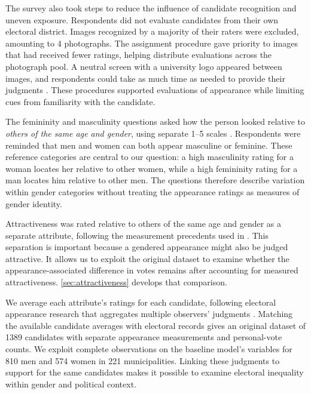 \documentclass[11pt,a4paper]{article}\usepackage[]{graphicx}\usepackage[]{xcolor}
\begin{document}
The survey also took steps to reduce the influence of candidate recognition and uneven exposure. Respondents did not evaluate candidates from their own electoral district. Images recognized by a majority of their raters were excluded, amounting to 4 photographs. The assignment procedure gave priority to images that had received fewer ratings, helping distribute evaluations across the photograph pool. A neutral screen with a university logo appeared between images, and respondents could take as much time as needed to provide their judgments \parencite{Bahamonde2024}. These procedures supported evaluations of appearance while limiting cues from familiarity with the candidate.

The femininity and masculinity questions asked how the person looked relative to \emph{others of the same age and gender}, using separate 1--5 scales \parencite{Bahamonde2024,HossEtAl2005}. Respondents were reminded that men and women can both appear masculine or feminine. These reference categories are central to our question: a high masculinity rating for a woman locates her relative to other women, while a high femininity rating for a man locates him relative to other men. The questions therefore describe variation within gender categories without treating the appearance ratings as measures of gender identity.

Attractiveness was rated relative to others of the same age and gender as a separate attribute, following the measurement precedents used in \textcite{Bono2017,GriffinLanglois2006,Tu2022}. This separation is important because a gendered appearance might also be judged attractive. It allows us to exploit the original dataset to examine whether the appearance-associated difference in votes remains after accounting for measured attractiveness. \autoref{sec:attractiveness} develops that comparison.

We average each attribute's ratings for each candidate, following electoral appearance research that aggregates multiple observers' judgments \parencite{BerggrenEtAl2010}. Matching the available candidate averages with electoral records gives an original dataset of 1389 candidates with separate appearance measurements and personal-vote counts. We exploit complete observations on the baseline model's variables for 810 men and 574 women in 221 municipalities. Linking these judgments to support for the same candidates makes it possible to examine electoral inequality within gender and political context.
\end{document}
